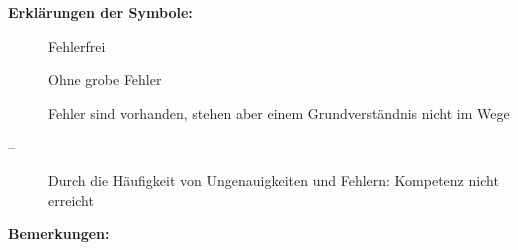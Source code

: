 {{				\vspace{0.4em}

				\begin{minipage}{0.36\textwidth}
					\footnotesize
					\textbf{Erklärungen der Symbole:}
					\begin{description}
						\item[] Fehlerfrei
						\item[] Ohne grobe Fehler
						\item[] Fehler sind vorhanden, stehen aber einem Grundverständnis nicht im Wege
						\item[--] Durch die Häufigkeit von Ungenauigkeiten und Fehlern: Kompetenz nicht erreicht
					\end{description}
				\end{minipage}
				\begin{minipage}{0.63\textwidth}
					\textbf{Bemerkungen:}
					\kommentar
				\end{minipage}

				
			\renewcommand{\arraystretch}{1}
			\clearpage
		}
	\getNotenAuswertung
}
\newcommand{\getNote}{%
	\ifthenelse{\boolean{schule@kmkPunkte}}{}{%
		\tikzmath{
			real \summe;
			\summe=0;
			real \gesamt;
			\gesamt = 0;
		}
		\ForEachQuestion{%
			\IfQuestionPropertyT{points}{##1}{%
				\tikzmath{\gesamt = \gesamt + \GetQuestionProperty{points}{##1};}%
			}%
			\tikzmath{\summe = \summe + \GetQuestionProperty{\krzl}{##1};}%
		}
		\tikzmath{
			real \eins;
			real \zwei;
			real \drei;
			real \vier;
			real \fuenf;
		}
		\notenschemaTikz
		\ifthenelse{\equal{\GetQuestionProperty{half}{1}}{true}}{%
			\tikzmath{%
				\eins = \eins*\gesamt;
				\zwei = \zwei*\gesamt;
				\drei = \drei*\gesamt;
				\vier = \vier*\gesamt;
				\fuenf = \fuenf*\gesamt;
			}
		}{%
			\tikzmath{%
				\eins = round(\eins*\gesamt);
				\zwei = round(\zwei*\gesamt);
				\drei = round(\drei*\gesamt);
				\vier = round(\vier*\gesamt);
				\fuenf = round(\fuenf*\gesamt);
			}
		}
		\tikzmath{
			if \summe < \fuenf then { let \note=ungenügend; }	else { 
				if \summe < \vier then { let \note=mangelhaft; } else {
					if \summe < \drei then { let \note=ausreichend; } else {
						if \summe < \zwei then { let \note=befriedigend; } else {
							if \summe < \eins then { let \note=gut;} else {
								let \note=sehr gut;
							};
						};
					};
				};
			};
		}
		\note
	}
}
